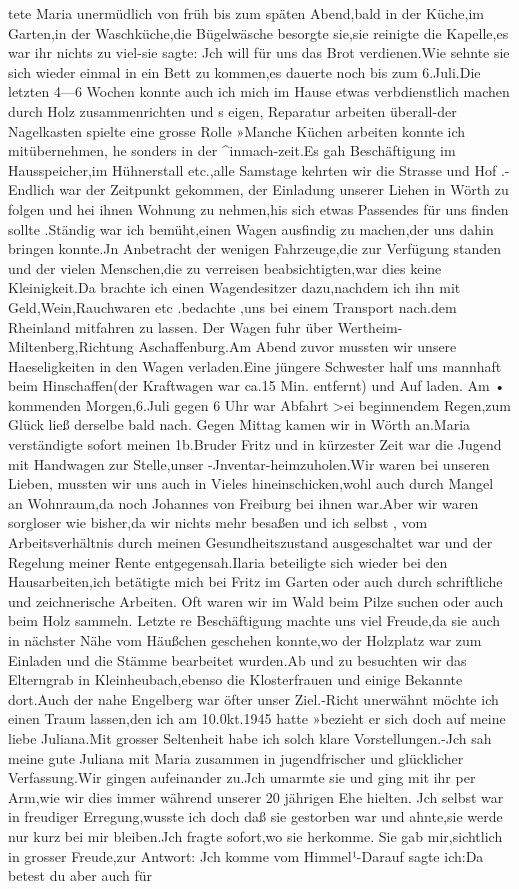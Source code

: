 \documentclass[a4paper,11pt]{article}
\begin{document}
 tete Maria unermüdlich von früh bis zum späten Abend,bald in der Küche,im Garten,in der Waschküche,die Bügelwäsche besorgte sie,sie reinigte die Kapelle,es war ihr nichts zu viel-sie sagte: Jch will für uns das Brot verdienen.Wie sehnte sie sich wieder einmal in ein Bett zu kommen,es dauerte noch bis zum 6.Juli.Die letzten 4—6 Wochen konnte auch ich mich im Hause etwas verbdienstlich machen durch Holz zusammenrichten und s eigen, Reparatur arbeiten überall-der Nagelkasten spielte eine grosse Rolle »Manche Küchen arbeiten konnte ich mitübernehmen, he sonders in der ^inmach-zeit.Es gah Beschäftigung im Hausspeicher,im Hühnerstall etc.,alle Samstage kehrten wir die Strasse und Hof .-Endlich war der Zeitpunkt gekommen, der Einladung unserer Liehen in Wörth zu folgen und hei ihnen Wohnung zu nehmen,his sich etwas Passendes für uns finden sollte .Ständig war ich bemüht,einen Wagen ausfindig zu machen,der uns dahin bringen konnte.Jn Anbetracht der wenigen Fahrzeuge,die zur Verfügung standen und der vielen Menschen,die zu verreisen beabsichtigten,war dies keine Kleinigkeit.Da brachte ich einen Wagendesitzer dazu,nachdem ich ihn mit Geld,Wein,Rauchwaren etc .bedachte ,uns bei einem Transport nach.dem Rheinland mitfahren zu lassen. Der Wagen fuhr über Wertheim-Miltenberg,Richtung Aschaffenburg.Am Abend zuvor mussten wir unsere Haeseligkeiten in den Wagen verladen.Eine jüngere Schwester half uns mannhaft beim Hinschaffen(der Kraftwagen war ca.15 Min. entfernt) und Auf laden. Am • kommenden Morgen,6.Juli gegen 6 Uhr war Abfahrt >ei beginnendem Regen,zum Glück ließ derselbe bald nach. Gegen Mittag kamen wir in Wörth an.Maria verständigte sofort meinen 1b.Bruder Fritz und in kürzester Zeit war die Jugend mit Handwagen zur Stelle,unser -Jnventar-heimzuholen.Wir waren bei unseren Lieben, mussten wir uns auch in Vieles hineinschicken,wohl auch durch Mangel an Wohnraum,da noch Johannes von Freiburg bei ihnen war.Aber wir waren sorgloser wie bisher,da wir nichts mehr besaßen und ich selbst , vom Arbeitsverhältnis durch meinen Gesundheitszustand ausgeschaltet war und der Regelung meiner Rente entgegensah.Ilaria beteiligte sich wieder bei den Hausarbeiten,ich betätigte mich bei Fritz im Garten oder auch durch schriftliche und zeichnerische Arbeiten. Oft waren wir im Wald beim Pilze suchen oder auch beim Holz sammeln. Letzte re Beschäftigung machte uns viel Freude,da sie auch in nächster Nähe vom Häußchen geschehen konnte,wo der Holzplatz war zum Einladen und die Stämme bearbeitet wurden.Ab und zu besuchten wir das Elterngrab in Kleinheubach,ebenso die Klosterfrauen und einige Bekannte dort.Auch der nahe Engelberg war öfter unser Ziel.-Richt unerwähnt möchte ich einen Traum lassen,den ich am 10.0kt.1945 hatte »bezieht er sich doch auf meine liebe Juliana.Mit grosser Seltenheit habe ich solch klare Vorstellungen.-Jch sah meine gute Juliana mit Maria zusammen in jugendfrischer und glücklicher Verfassung.Wir gingen aufeinander zu.Jch umarmte sie und ging mit ihr per Arm,wie wir dies immer während unserer 20 jährigen Ehe hielten. Jch selbst war in freudiger Erregung,wusste ich doch daß sie gestorben war und ahnte,sie werde nur kurz bei mir bleiben.Jch fragte sofort,wo sie herkomme. Sie gab mir,sichtlich in grosser Freude,zur Antwort: Jch komme vom Himmel¹-Darauf sagte ich:Da betest du aber auch für 
\end{document}
